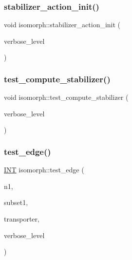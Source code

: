 \mbox{\label{classisomorph_af2775c095770cbeae014806409f0c4d3}} 
\subsubsection{\texorpdfstring{stabilizer\+\_\+action\+\_\+init()}{stabilizer\_action\_init()}}
{\footnotesize\ttfamily void isomorph\+::stabilizer\+\_\+action\+\_\+init (\begin{DoxyParamCaption}\item[{\mbox{\hyperlink{galois_8h_a09fddde158a3a20bd2dcadb609de11dc}{I\+NT}}}]{verbose\+\_\+level }\end{DoxyParamCaption})}

\mbox{\label{classisomorph_a72cd06f32311c44eb09dd73faa36b748}} 
\subsubsection{\texorpdfstring{test\+\_\+compute\+\_\+stabilizer()}{test\_compute\_stabilizer()}}
{\footnotesize\ttfamily void isomorph\+::test\+\_\+compute\+\_\+stabilizer (\begin{DoxyParamCaption}\item[{\mbox{\hyperlink{galois_8h_a09fddde158a3a20bd2dcadb609de11dc}{I\+NT}}}]{verbose\+\_\+level }\end{DoxyParamCaption})}

\mbox{\label{classisomorph_a591165fa287477b480f5b7081198ba46}} 
\subsubsection{\texorpdfstring{test\+\_\+edge()}{test\_edge()}}
{\footnotesize\ttfamily \mbox{\hyperlink{galois_8h_a09fddde158a3a20bd2dcadb609de11dc}{I\+NT}} isomorph\+::test\+\_\+edge (\begin{DoxyParamCaption}\item[{\mbox{\hyperlink{galois_8h_a09fddde158a3a20bd2dcadb609de11dc}{I\+NT}}}]{n1,  }\item[{\mbox{\hyperlink{galois_8h_a09fddde158a3a20bd2dcadb609de11dc}{I\+NT}} $\ast$}]{subset1,  }\item[{\mbox{\hyperlink{galois_8h_a09fddde158a3a20bd2dcadb609de11dc}{I\+NT}} $\ast$}]{transporter,  }\item[{\mbox{\hyperlink{galois_8h_a09fddde158a3a20bd2dcadb609de11dc}{I\+NT}}}]{verbose\+\_\+level }\end{DoxyParamCaption})}

